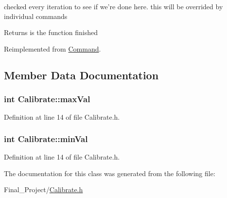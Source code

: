 checked every iteration to see if we're done here. this will be overrided by individual commands 

\begin{DoxyReturn}{Returns}
is the function finished 
\end{DoxyReturn}


Reimplemented from \hyperlink{classCommand_ae5846b4332a262e055c7a96759fa18f2}{Command}.



\subsection{Member Data Documentation}
\hypertarget{classCalibrate_a48cdb0fd93fef77a7eab3fc629e9d2a6}{
\subsubsection[{max\-Val}]{\setlength{\rightskip}{0pt plus 5cm}int Calibrate\-::max\-Val\hspace{0.3cm}{\ttfamily [private]}}}\label{classCalibrate_a48cdb0fd93fef77a7eab3fc629e9d2a6}


Definition at line 14 of file Calibrate.\-h.

\hypertarget{classCalibrate_a76f63e45bd236101217c023f5b4c00d0}{
\subsubsection[{min\-Val}]{\setlength{\rightskip}{0pt plus 5cm}int Calibrate\-::min\-Val\hspace{0.3cm}{\ttfamily [private]}}}\label{classCalibrate_a76f63e45bd236101217c023f5b4c00d0}


Definition at line 14 of file Calibrate.\-h.



The documentation for this class was generated from the following file\-:\begin{DoxyCompactItemize}
\item 
Final\-\_\-\-Project/\hyperlink{Calibrate_8h}{Calibrate.\-h}\end{DoxyCompactItemize}
